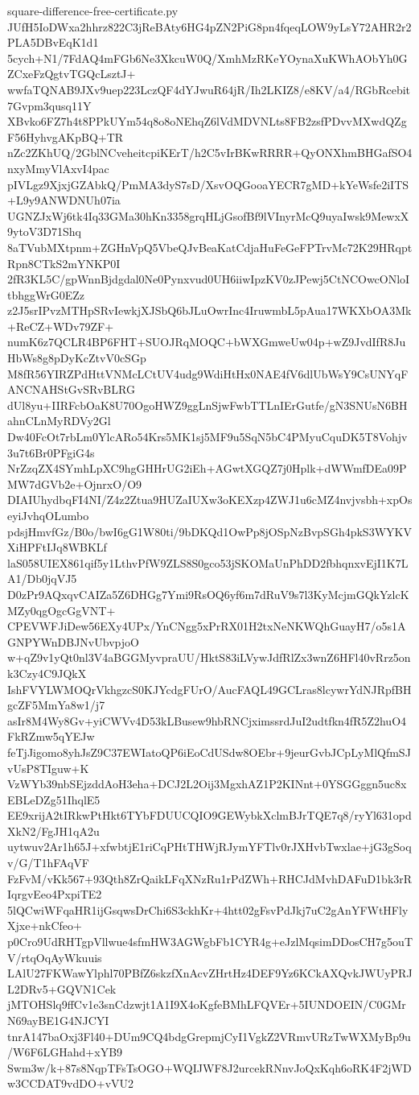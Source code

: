 \documentclass[11pt]{article}
\theoremstyle{definition}
\theoremstyle{remark}
\begin{document}
\begin{filecontents*}[overwrite]{square-difference-free-certificate.py}
JUfH5IoDWxa2hhrz822C3jReBAty6HG4pZN2PiG8pn4fqeqLOW9yLsY72AHR2r2PLA5DBvEqK1d1
5cych+N1/7FdAQ4mFGb6Ne3XkcuW0Q/XmhMzRKeYOynaXuKWhAObYh0GZCxeFzQgtvTGQcLsztJ+
wwfaTQNAB9JXv9uep223LczQF4dYJwuR64jR/Ih2LKIZ8/e8KV/a4/RGbRcebit7Gvpm3qusq11Y
XBvko6FZ7h4t8PPkUYm54q8o8oNEhqZ6lVdMDVNLts8FB2zsfPDvvMXwdQZgF56HyhvgAKpBQ+TR
nZc2ZKhUQ/2GblNCveheitcpiKErT/h2C5vIrBKwRRRR+QyONXhmBHGafSO4nxyMmyVlAxvI4pac
pIVLgz9XjxjGZAbkQ/PmMA3dyS7sD/XsvOQGooaYECR7gMD+kYeWsfe2iITS+L9y9ANWDNUh07ia
UGNZJxWj6tk4Iq33GMa30hKn3358grqHLjGsofBf9lVInyrMcQ9uyaIwsk9MewxX9ytoV3D71Shq
8aTVubMXtpnm+ZGHnVpQ5VbeQJvBeaKatCdjaHuFeGeFPTrvMc72K29HRqptRpn8CTkS2mYNKP0I
2fR3KL5C/gpWnnBjdgdal0Ne0Pynxvud0UH6iiwIpzKV0zJPewj5CtNCOwcONloItbhggWrG0EZz
z2J5srIPvzMTHpSRvIewkjXJSbQ6bJLuOwrInc4IruwmbL5pAua17WKXbOA3Mk+ReCZ+WDv79ZF+
numK6z7QCLR4BP6FHT+SUOJRqMOQC+bWXGmweUw04p+wZ9JvdIfR8JuHbWs8g8pDyKcZtvV0cSGp
M8fR56YIRZPdHttVNMcLCtUV4udg9WdiHtHx0NAE4fV6dlUbWsY9CsUNYqFANCNAHStGvSRvBLRG
dUl8yu+IIRFcbOaK8U70OgoHWZ9ggLnSjwFwbTTLnIErGutfe/gN3SNUsN6BHahnCLnMyRDVy2Gl
Dw40FcOt7rbLm0YlcARo54Krs5MK1sj5MF9u5SqN5bC4PMyuCquDK5T8Vohjv3u7t6Br0PFgiG4s
NrZzqZX4SYmhLpXC9hgGHHrUG2iEh+AGwtXGQZ7j0Hplk+dWWmfDEa09PMW7dGVb2e+OjnrxO/O9
DIAIUhydbqFI4NI/Z4z2Ztua9HUZaIUXw3oKEXzp4ZWJ1u6cMZ4nvjvsbh+xpOseyiJvhqOLumbo
pdsjHmvfGz/B0o/bwI6gG1W80ti/9bDKQd1OwPp8jOSpNzBvpSGh4pkS3WYKVXiHPFtIJq8WBKLf
laS058UIEX861qif5y1LthvPfW9ZLS8S0gco53jSKOMaUnPhDD2fbhqnxvEjI1K7LA1/Db0jqVJ5
D0zPr9AQxqvCAIZa5Z6DHGg7Ymi9RsOQ6yf6m7dRuV9s7l3KyMcjmGQkYzlcKMZy0qgOgcGgVNT+
CPEVWFJiDew56EXy4UPx/YnCNgg5xPrRX01H2txNeNKWQhGuayH7/o5s1AGNPYWnDBJNvUbvpjoO
w+qZ9v1yQt0nl3V4aBGGMyvpraUU/HktS83iLVywJdfRlZx3wnZ6HFl40vRrz5onk3Czy4C9JQkX
IshFVYLWMOQrVkhgzcS0KJYcdgFUrO/AucFAQL49GCLras8lcywrYdNJRpfBHgcZF5MmYa8w1/j7
asIr8M4Wy8Gv+yiCWVv4D53kLBusew9hbRNCjximssrdJuI2udtfkn4fR5Z2huO4FkRZmw5qYEJw
feTjJigomo8yhJsZ9C37EWIatoQP6iEoCdUSdw8OEbr+9jeurGvbJCpLyMlQfmSJvUsP8TIguw+K
VzWYb39nbSEjzddAoH3eha+DCJ2L2Oij3MgxhAZ1P2KINnt+0YSGGggn5uc8xEBLeDZg51IhqlE5
EE9xrijA2tIRkwPtHkt6TYbFDUUCQIO9GEWybkXclmBJrTQE7q8/ryYl631opdXkN2/FgJH1qA2u
uytwuv2Ar1h65J+xfwbtjE1riCqPHtTHWjRJymYFTlv0rJXHvbTwxlae+jG3gSoqv/G/T1hFAqVF
FzFvM/vKk567+93Qth8ZrQaikLFqXNzRu1rPdZWh+RHCJdMvhDAFuD1bk3rRIqrgvEeo4PxpiTE2
5lQCwiWFqaHR1ijGsqwsDrChi6S3ckhKr+4htt02gFsvPdJkj7uC2gAnYFWtHFlyXjxe+nkCfeo+
p0Cro9UdRHTgpVllwue4sfmHW3AGWgbFb1CYR4g+eJzlMqsimDDosCH7g5ouTV/rtqOqAyWkuuis
LAlU27FKWawYlphl70PBfZ6skzfXnAcvZHrtHz4DEF9Yz6KCkAXQvkJWUyPRJL2DRv5+GQVN1Cek
jMTOHSlq9ffCv1e3snCdzwjt1A1I9X4oKgfeBMhLFQVEr+5IUNDOEIN/C0GMrN69ayBE1G4NJCYI
tnrA147baOxj3Fl40+DUm9CQ4bdgGrepmjCyI1VgkZ2VRmvURzTwWXMyBp9u/W6F6LGHahd+xYB9
Swm3w/k+87s8NqpTFsTsOGO+WQIJWF8J2urcekRNnvJoQxKqh6oRK4F2jWDw3CCDAT9vdDO+vVU2

\end{filecontents*}
\end{document}
